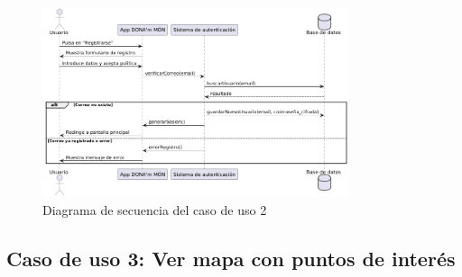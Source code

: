 \begin{figure}[H]
    \centering
    \includegraphics[width=0.8\textwidth]{figs/caso2.png}
    \caption{Diagrama de secuencia del caso de uso 2}
\end{figure}


\subsection{Caso de uso 3: Ver mapa con puntos de interés}


